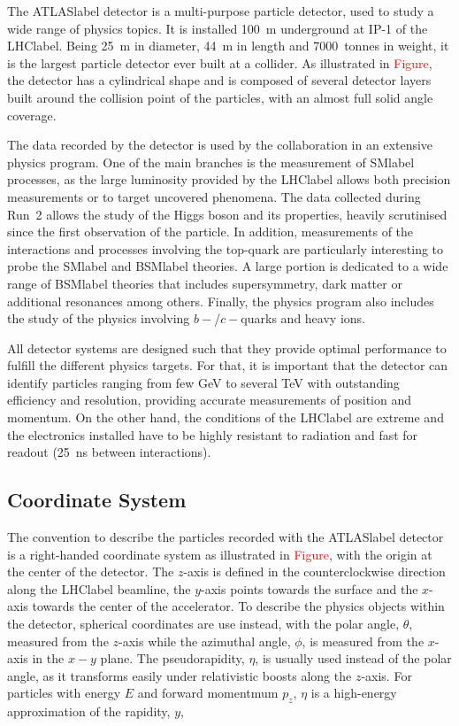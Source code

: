The \acrshort{ATLASlabel} detector is a multi-purpose particle detector, used to study a wide range of physics topics. It is installed 100~m underground at IP-1 of the \acrshort{LHClabel}. Being 25~m in diameter, 44~m in length and 7000~tonnes in weight, it is the largest particle detector ever built at a collider. As illustrated in \textcolor{red}{Figure}, the detector has a cylindrical shape and is composed of several detector layers built around the collision point of the particles, with an almost full solid angle coverage.

The data recorded by the detector is used by the collaboration in an extensive physics program. One of the main branches is the measurement of \acrshort{SMlabel} processes, as the large luminosity provided by the \acrshort{LHClabel} allows both precision measurements or to target uncovered phenomena. The data collected during Run~2 allows the study of the Higgs boson and its properties, heavily scrutinised since the first observation of the particle. In addition, measurements of the interactions and processes involving the top-quark are particularly interesting to probe the \acrshort{SMlabel} and \acrshort{BSMlabel} theories. A large portion is dedicated to a wide range of \acrshort{BSMlabel} theories that includes supersymmetry, dark matter or additional resonances among others. Finally, the physics program also includes the study of the physics involving $b-$/$c-$quarks and heavy ions.

All detector systems are designed such that they provide optimal performance to fulfill the different physics targets. For that, it is important that the detector can identify particles ranging from few GeV to several TeV with outstanding efficiency and resolution, providing accurate measurements of position and momentum. On the other hand, the conditions of the \acrshort{LHClabel} are extreme and the electronics installed have to be highly resistant to radiation and fast for readout (25~ns between interactions).

\subsection{Coordinate System}

The convention to describe the particles recorded with the \acrshort{ATLASlabel} detector is a right-handed coordinate system as illustrated in \textcolor{red}{Figure}, with the origin at the center of the detector. The $z$-axis is defined in the counterclockwise direction along the \acrshort{LHClabel} beamline, the $y$-axis points towards the surface and the $x$-axis towards the center of the accelerator. To describe the physics objects within the detector, spherical coordinates are use instead, with the polar angle, $\theta$, measured from the $z$-axis while the azimuthal angle, $\phi$, is measured from the $x$-axis in the $x-y$ plane. The pseudorapidity, $\eta$, is usually used instead of the polar angle, as it transforms easily under relativistic boosts along the $z$-axis. For particles with energy $E$ and forward momentmum $p_z$, $\eta$ is a high-energy approximation of the rapidity, $y$,

